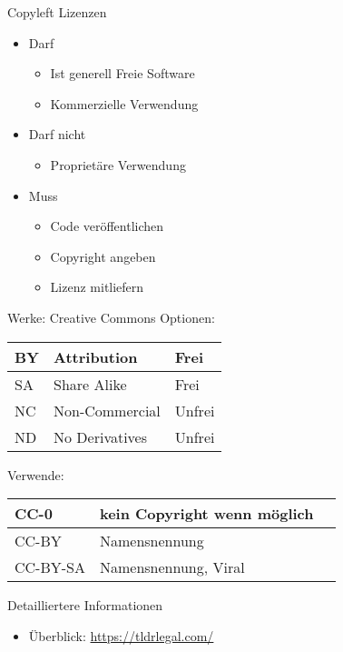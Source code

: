 \begin{frame}{Copyleft Lizenzen}
	\begin{itemize}
		\item Darf
		\begin{itemize}
			\item Ist generell Freie Software
			\item Kommerzielle Verwendung
		\end{itemize}
		\item Darf nicht
		\begin{itemize}
			\item Proprietäre Verwendung
		\end{itemize}
		\item Muss
		\begin{itemize}
			\item Code veröffentlichen
			\item Copyright angeben
			\item Lizenz mitliefern
		\end{itemize}
	\end{itemize}
\end{frame}

\begin{frame}{Werke: Creative Commons}
	Optionen:\\
	\begin{tabular}{|l|l|l|}
		\hline
		BY	& Attribution		& Frei\\
		\hline
		SA	& Share Alike		& Frei\\
		\hline
		NC	& Non-Commercial	& Unfrei\\
		\hline
		ND	& No Derivatives	& Unfrei\\
		\hline
	\end{tabular} 
	
	Verwende:\\
	\begin{tabular}{|l|l|l|}
		\hline
		CC-0		& kein Copyright wenn möglich\\
		\hline
		CC-BY		& Namensnennung\\
		\hline
		CC-BY-SA	& Namensnennung, Viral\\
		\hline
	\end{tabular} 
\end{frame}


\begin{frame}{Detailliertere Informationen}
	\begin{itemize}
		\item Überblick: \url{https://tldrlegal.com/}
	\end{itemize}
\end{frame}
